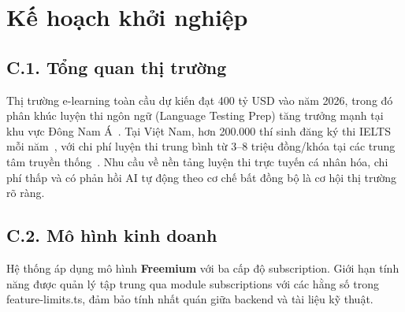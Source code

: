 \chapter{Kế hoạch khởi nghiệp}
\label{app:khoinghiep}

\section*{C.1. Tổng quan thị trường}

Thị trường e-learning toàn cầu dự kiến đạt 400 tỷ USD vào năm 2026, trong đó phân khúc luyện thi ngôn ngữ (Language Testing Prep) tăng trưởng mạnh tại khu vực Đông Nam Á~\cite{statista-elearning}. Tại Việt Nam, hơn 200.000 thí sinh đăng ký thi IELTS mỗi năm~\cite{ielts-vietnam-2023}, với chi phí luyện thi trung bình từ 3--8 triệu đồng/khóa tại các trung tâm truyền thống~\cite{ielts-global-stats}. Nhu cầu về nền tảng luyện thi trực tuyến cá nhân hóa, chi phí thấp và có phản hồi AI tự động theo cơ chế bất đồng bộ là cơ hội thị trường rõ ràng.

\section*{C.2. Mô hình kinh doanh}

Hệ thống áp dụng mô hình \textbf{Freemium} với ba cấp độ subscription. Giới hạn tính năng được quản lý tập trung qua module subscriptions với các hằng số trong feature-limits.ts, đảm bảo tính nhất quán giữa backend và tài liệu kỹ thuật.

